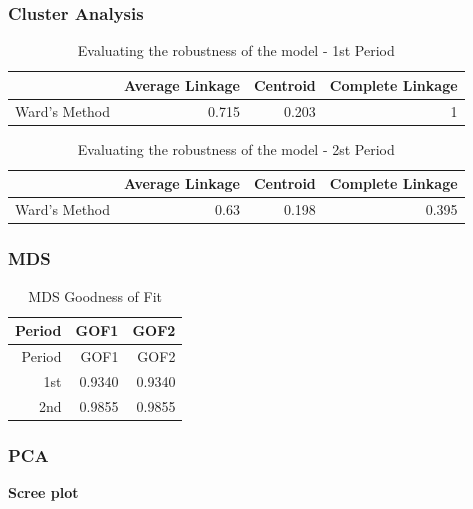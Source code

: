 \documentclass[11pt,a4paper,]{article}
\begin{document}
\hypertarget{cluster-analysis-1}{%
\subsubsection{Cluster Analysis}\label{cluster-analysis-1}}

\begingroup\fontsize{10}{12}\selectfont

\begin{longtable}[t]{lrrr}
\caption{\label{tab:rand-1}Evaluating the robustness of the model - 1st Period}\\
\toprule
  & Average Linkage & Centroid & Complete Linkage\\
\midrule
Ward's Method & 0.715 & 0.203 & 1\\
\bottomrule
\end{longtable}
\endgroup{}

\begingroup\fontsize{10}{12}\selectfont

\begin{longtable}[t]{lrrr}
\caption{\label{tab:rand-2}Evaluating the robustness of the model - 2st Period}\\
\toprule
  & Average Linkage & Centroid & Complete Linkage\\
\midrule
Ward's Method & 0.63 & 0.198 & 0.395\\
\bottomrule
\end{longtable}
\endgroup{}

\hypertarget{mds}{%
\subsubsection{MDS}\label{mds}}

\begin{longtable}[]{@{}rrr@{}}
\caption{\label{tab:mds-gof}MDS Goodness of Fit}\tabularnewline
\toprule\noalign{}
Period & GOF1 & GOF2 \\
\midrule\noalign{}
\endfirsthead
\toprule\noalign{}
Period & GOF1 & GOF2 \\
\midrule\noalign{}
\endhead
\bottomrule\noalign{}
\endlastfoot
1st & 0.9340 & 0.9340 \\
2nd & 0.9855 & 0.9855 \\
\end{longtable}

\hypertarget{pca}{%
\subsubsection{PCA}\label{pca}}

\textbf{Scree plot}
\end{document}
